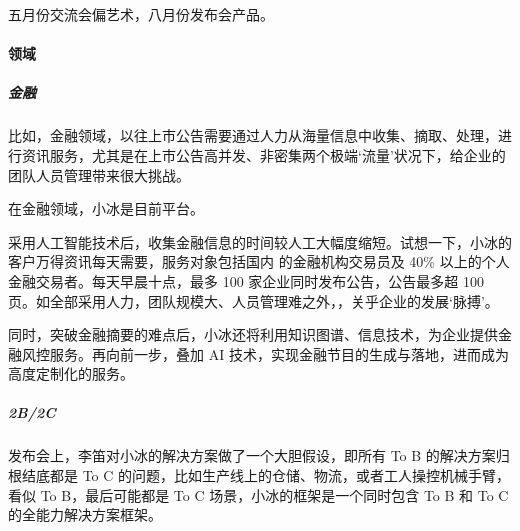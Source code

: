 \documentclass[letterpaper,10pt,english]{sphinxmanual}
\begin{document}
五月份交流会偏艺术，八月份发布会产品。


\paragraph{领域}
\label{\detokenize{chapter_AI_company/xiaoice:id10}}

\subparagraph{金融}
\label{\detokenize{chapter_AI_company/xiaoice:id11}}
比如，金融领域，以往上市公告需要通过人力从海量信息中收集、摘取、处理，进行资讯服务，尤其是在上市公告高并发、非密集两个极端‘流量’状况下，给企业的团队人员管理带来很大挑战。

在金融领域，小冰是目前平台。%
\begin{footnote}[1062]\sphinxAtStartFootnote
{}
%
\end{footnote}

采用人工智能技术后，收集金融信息的时间较人工大幅度缩短。试想一下，小冰的客户万得资讯每天需要，服务对象包括国内 的金融机构交易员及 40\%
以上的个人金融交易者。每天早晨十点，最多 100
家企业同时发布公告，公告最多超 100
页。如全部采用人力，团队规模大、人员管理难之外，，关乎企业的发展‘脉搏’。

同时，突破金融摘要的难点后，小冰还将利用知识图谱、信息技术，为企业提供金融风控服务。再向前一步，叠加
AI 技术，实现金融节目的生成与落地，进而成为高度定制化的服务。


\subparagraph{2B/2C}
\label{\detokenize{chapter_AI_company/xiaoice:b-2c}}
发布会上，李笛对小冰的解决方案做了一个大胆假设，即所有 To B
的解决方案归根结底都是 To C
的问题，比如生产线上的仓储、物流，或者工人操控机械手臂，看似 To
B，最后可能都是 To C 场景，小冰的框架是一个同时包含 To B 和 To C
的全能力解决方案框架。
\end{document}
